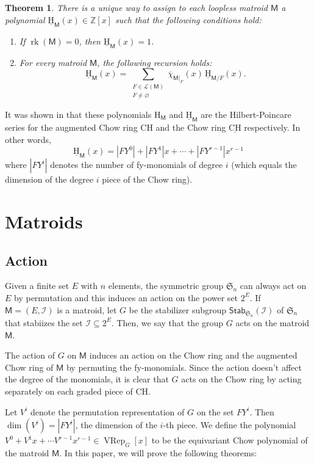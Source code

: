 \documentclass[11pt, a4paper, english]{amsart}
\theoremstyle{teoremas}
\newtheorem{theorem}{Theorem}[section]
\theoremstyle{definition}
\DeclareMathOperator{\rk}{rk}
\newcommand{\M}{\mathsf{M}}
\newcommand{\stab}{\mathsf{Stab}}
\newcommand{\cI}{\mathcal{I}}
\newcommand{\symm}{\mathfrak{S}}
\renewcommand{\H}{\mathrm{H}}
\newcommand{\CH}{\mathrm{CH}}
\newcommand{\uH}{\underline{\mathrm{H}}}
\newcommand{\uCH}{\underline{\mathrm{CH}}}
\newcommand{\VRep}{\operatorname{VRep}}
\begin{document}
\begin{theorem}\label{thm:fmsv-intro-main0}
    There is a unique way to assign to each loopless matroid $\M$  a polynomial $\uH_{\M}(x)\in \mathbb{Z}[x]$ such that the following conditions hold:
    \begin{enumerate}[\normalfont(i)]
        \item If $\rk(\M) = 0$, then $\uH_{\M}(x) = 1$.
        \item For every matroid $\M$, the following recursion holds:
            \[ \uH_{\M}(x) = \sum_{\substack{F\in\mathcal{L}(\M)\\ F\neq\varnothing}} \overline{\chi}_{\M|_F}(x)\, \uH_{\M/F}(x).\]
    \end{enumerate}
\end{theorem}

It was shown in \cite{fmsv24} that these polynomials $\H_\M$ and $\uH_\M$ are the Hilbert-Poincare series
for the augmented Chow ring $\CH$ and the Chow ring $\uCH$ respectively. In other words,
$$\uH_\M(x) = |FY^0| + |FY^1|x +\cdots + |FY^{r-1}|x^{r-1}$$
where $|FY^i|$ denotes the number of fy-monomials of degree $i$ (which equals the dimension of the degree $i$ piece of the Chow ring).

\section{Matroids}\label{sec:matroids}
\subsection{Action}
Given a finite set $E$ with $n$ elements, the symmetric group $\symm_n$ can always act on $E$ by permutation and this induces an
action on the power set $2^E$. If $\M = (E, \cI)$ is a matroid, let $G$ be the stabilizer subgroup $\stab_{\symm_n}(\cI)$ of $\symm_n$ that
stabiizes the set $\cI\subseteq 2^E$. Then, we say that the group $G$ acts on the matroid $\M$.

The action of $G$ on $\M$ induces an action on the Chow ring and the augmented Chow ring of $\M$ by permuting the fy-monomials. Since the action doesn't
affect the degree of the monomials, it is clear that $G$ acts on the Chow ring by acting separately on each graded piece of $\CH$.

Let $V^i$ denote the permutation representation of $G$ on the set $FY^i$. Then $\dim(V^i) = |FY^i|$, the dimension of the $i$-th piece.
We define the polynomial $V^0+V^1x+\cdots V^{r-1}x^{r-1}\in\VRep_G[x]$ to be the equivariant Chow polynomial of the matroid $\M$. In this paper,
we will prove the following theorems:
\end{document}
